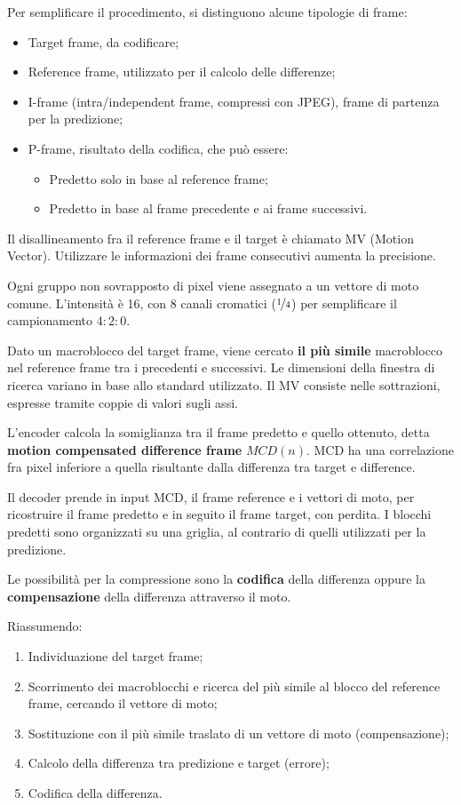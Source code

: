 Per semplificare il procedimento, si distinguono alcune tipologie di frame:
\begin{itemize}
	\item Target frame, da codificare;
	\item Reference frame, utilizzato per il calcolo delle differenze;
	\item I-frame (intra/independent frame, compressi con JPEG), frame di partenza per la predizione;
	\item P-frame, risultato della codifica, che può essere:
	\begin{itemize}
		\item Predetto solo in base al reference frame;
		\item Predetto in base al frame precedente e ai frame successivi. 
	\end{itemize}
\end{itemize}
Il disallineamento fra il reference frame e il target è chiamato MV (Motion Vector). Utilizzare le informazioni dei frame consecutivi aumenta la precisione.

Ogni gruppo non sovrapposto di pixel viene assegnato a un vettore di moto comune. L'intensità è 16, con 8 canali cromatici ($\nicefrac{1}{4}$) per semplificare il campionamento $4 : 2 : 0$. 

Dato un macroblocco del target frame, viene cercato \textbf{il più simile} macroblocco nel reference frame tra i precedenti e successivi. Le dimensioni della finestra di ricerca variano in base allo standard utilizzato. Il MV consiste nelle sottrazioni, espresse tramite coppie di valori sugli assi.

L'encoder calcola la somiglianza tra il frame predetto e quello ottenuto, detta \textbf{motion compensated difference frame} $MCD(n)$. MCD ha una correlazione fra pixel inferiore a quella risultante dalla differenza tra target e difference.

Il decoder prende in input MCD, il frame reference e i vettori di moto, per ricostruire il frame predetto e in seguito il frame target, con perdita. I blocchi predetti sono organizzati su una griglia, al contrario di quelli utilizzati per la predizione.

Le possibilità per la compressione sono la \textbf{codifica} della differenza oppure la \textbf{compensazione} della differenza attraverso il moto. 

Riassumendo:
\begin{enumerate}
	\item Individuazione del target frame;
	\item Scorrimento dei macroblocchi e ricerca del più simile al blocco del reference frame, cercando il vettore di moto;
	\item Sostituzione con il più simile traslato di un vettore di moto (compensazione);
	\item Calcolo della differenza tra predizione e target (errore);
	\item Codifica della differenza.
\end{enumerate}

